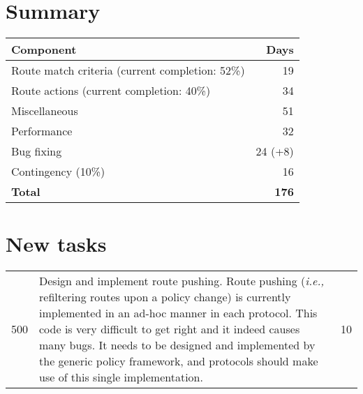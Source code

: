 \documentclass[letterpaper]{article}
\begin{document}
\section{Summary}
\begin{center}
\begin{tabular}{|l |r|}
\hline
Component	& Days \\
\hline
Route match criteria (current completion: 52\%)	& 19 \\
Route actions (current completion: 40\%)	& 34 \\
\hline
Miscellaneous		& 51 \\
Performance		& 32 \\
\hline
Bug fixing		& 24 (+8) \\
\hline
Contingency (10\%)	& 16 \\
\hline
\hline
{\bf Total}		& {\bf 176} \\
\hline

\end{tabular}
\end{center}

\section{New tasks}
\begin{center}
\tabletail{
\hline
}
\begin{supertabular}{|r |p{12cm} |r|}
\hline

500 &
Design and implement route pushing.  Route pushing ({\em i.e.,} refiltering
routes upon a policy change) is currently implemented in an ad-hoc manner in
each protocol.  This code is very difficult to get right and it indeed causes
many bugs.  It needs to be designed and implemented by the generic policy
framework, and protocols should make use of this single implementation.
& 10 \\

\end{supertabular}
\end{center}
\end{document}

